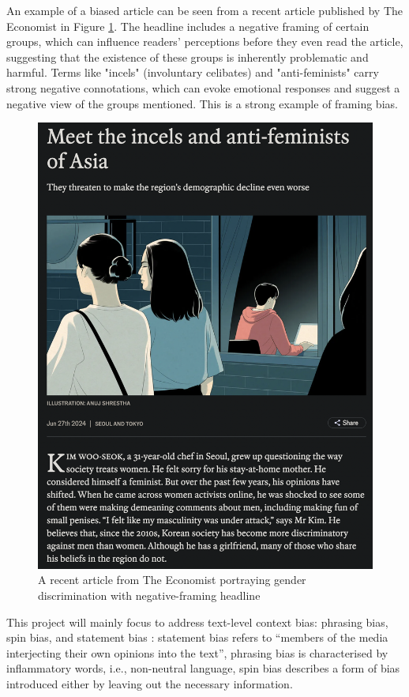 An example of a biased article can be seen from a recent article published by The Economist in Figure \ref{fig:the-economist-biased-article}. The headline includes a negative framing of certain groups, which can influence readers' perceptions before they even read the article, suggesting that the existence of these groups is inherently problematic and harmful. Terms like "incels" (involuntary celibates) and "anti-feminists" carry strong negative connotations, which can evoke emotional responses and suggest a negative view of the groups mentioned. This is a strong example of framing bias.

\begin{figure}[htbp]
    \centering
    \includegraphics[width=0.9\linewidth]{images/the-economist-biased-article.png}
    \caption{A recent article from The Economist portraying gender discrimination with negative-framing headline}
    \label{fig:the-economist-biased-article}
\end{figure}

This project will mainly focus to address text-level context bias: phrasing bias, spin bias, and statement bias \cite{spinde-2024-taxonomy}: statement bias refers to “members of the media interjecting their own opinions into the text”, phrasing bias is characterised by inflammatory words, i.e., non-neutral language, spin bias describes a form of bias introduced either by leaving out the necessary information.


